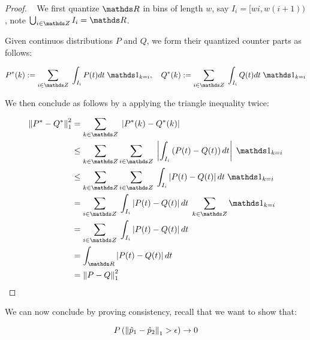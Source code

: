 \begin{proof}
    ~
    We first quantize $\R$ in bins of length $w$, say $I_i = [wi, w(i + 1))$, note 
    $\bigcup_{i \in \Z} I_i = \R$.

    Given continuos distributions $P$ and $Q$, we form their quantized counter parts as
    follows:

    $$
        P^*(k) := \sum _{i \in \Z} \; \int_{I_i} P(t) dt \; \Ind_{k  = i}
        , \quad   Q^*(k) := \sum _{i \in \Z} \; \int_{I_i} Q(t) dt \; \Ind_{k  = i}
    $$

    We then conclude as follows by a applying the triangle inequality twice:

    \begin{align*}
        \norm{P^* - Q^*}_1^2 &= \sum _{k \in \Z} \; \left| P^*(k) - Q^*(k)\right|  \\
        &\leq \sum _{k \in \Z} \sum _{i \in \Z} \; \left| \int_{I_i} \left(P(t) - Q(t)\right) dt \right|  \; \Ind_{k  = i} \\
        &\leq \sum _{k \in \Z} \sum _{i \in \Z} \;  \int_{I_i} \left|P(t) - Q(t)\right| dt  \; \Ind_{k  = i} \\
        &= \sum _{i \in \Z} \;  \int_{I_i} \left|P(t) - Q(t)\right| dt  \; \sum _{k \in \Z} \Ind_{k  = i} \\
        &= \sum _{i \in \Z} \;  \int_{I_i} \left|P(t) - Q(t)\right| dt \\
        &= \int_{\R} \left|P(t) - Q(t)\right| dt \\
        &= \norm{P - Q}_1^2
    \end{align*}

\end{proof}

We can now conclude by proving consistency, recall that we want to show that:

$$
    P \left(\left\lVert\hat{p}_1 - \hat{p}_2\right\rVert_1 > \epsilon \right) \rightarrow 0
$$

